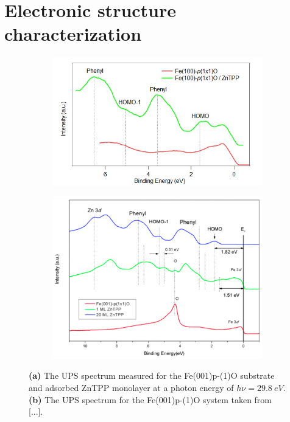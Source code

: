 \section*{Electronic structure characterization}
\begin{figure}[h]
    \centering
    \begin{subfigure}{0.49\textwidth}
        \centering
        \includegraphics[width = \textwidth]{Plots/integrated_spectrum_Fe.png}
        \caption{}
        \label{fig:ups_spectrum}
    \end{subfigure}
    \hfill
    \begin{subfigure}{0.49\textwidth}
        \centering
        \includegraphics[width = \textwidth]{Plots/integrated_spectrum_Fe_lit.png}
        \caption{}
        \label{fig:ups_spectrum_lit}
    \end{subfigure}
    \caption{\textbf{(a)} The UPS spectrum measured for the Fe(001)p-(1)O substrate and adsorbed ZnTPP monolayer at a photon energy of $h\nu = \qty{29.8}{eV}$. \textbf{(b)} The UPS spectrum for the Fe(001)p-(1)O system taken from [...].}
    \label{fig:ups}
\end{figure}

